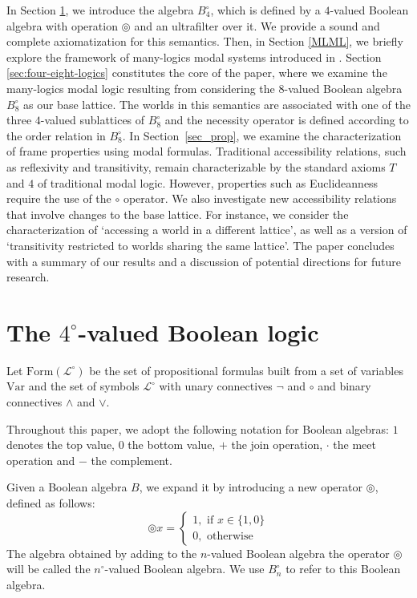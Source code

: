 \documentclass{amsart}
\newcommand{\For}{\mathrm{Form}}
\newcommand{\VAR}{\mathrm{Var}}
\begin{document}
In Section \ref{sec_4-valued}, we introduce the algebra $B_4^\circ$, which is defined by a $4$-valued Boolean algebra with operation $\circledcirc$ and an ultrafilter over it. We provide a sound and complete axiomatization for this semantics. Then, in Section \ref{MLML}, we briefly explore the framework of many-logics modal systems introduced in \cite{freire_modality_2024}. Section \ref{sec:four-eight-logics} constitutes the core of the paper, where we examine the many-logics modal logic resulting from considering the $8$-valued Boolean algebra $B_8^\circ$ as our base lattice. The worlds in this semantics are associated with one of the three $4$-valued sublattices of $B_8^\circ$ and the necessity operator is defined according to the order relation in $B_8^\circ$. In Section~\ref{sec_prop}, we examine the characterization of frame properties using modal formulas. Traditional accessibility relations, such as reflexivity and transitivity, remain characterizable by the standard axioms $T$ and $4$ of traditional modal logic. However, properties such as Euclideanness require the use of the $\circ$ operator. We also investigate new accessibility relations that involve changes to the base lattice. For instance, we consider the characterization of `accessing a world in a different lattice', as well as a version of `transitivity restricted to worlds sharing the same lattice'. The paper concludes with a summary of our results and a discussion of potential directions for future research.

\section{The \texorpdfstring{$4^\circ$}{4-ball}-valued Boolean logic}\label{sec_4-valued}

Let $\For(\mathcal{L}^\circ)$ be the set of propositional formulas built from a set of variables $\VAR$ and the set of symbols $\mathcal{L}^\circ$ with unary connectives $\neg$ and $\circ$ and binary connectives $\wedge$ and $\vee$.

Throughout this paper, we adopt the following notation for Boolean algebras: $1$ denotes the top value, $0$ the bottom value, $+$ the join operation, $\cdot$ the meet operation and $-$ the complement.

Given a Boolean algebra $B$, we expand it by introducing a new operator $\circledcirc$, defined as follows:
$$\circledcirc x = \begin{cases}
	1, \text{ if } x \in \{1, 0\}\\
	0, \text{ otherwise}
\end{cases}$$
The algebra obtained by adding to the $n$-valued Boolean algebra the operator $\circledcirc$ will be called the $n^\circ$-valued Boolean algebra. We use $B^\circ_n$ to refer to this Boolean algebra.
\end{document}

